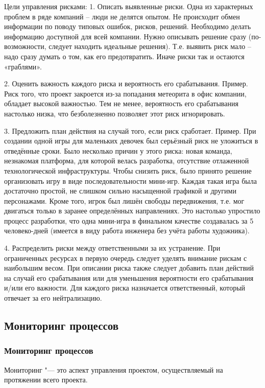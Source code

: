 \documentclass{../industrial-development}
\begin{document}
Цели управления рисками:
1. Описать выявленные риски.
Одна из характерных проблем в ряде компаний – люди не делятся опытом. Не происходит обмен информации по поводу типовых ошибок, рисков, решений. Необходимо делать информацию доступной для всей компании.
Нужно описывать решение сразу (по-возможности, следует находить идеальные решения). Т.е. выявить риск мало – надо сразу думать о том, как его предотвратить. Иначе риски так и остаются «граблями».

2. Оценить важность каждого риска и вероятность его срабатывания.
Пример. Риск того, что проект закроется из-за попадания метеорита в офис компании, обладает высокой важностью. Тем не менее, вероятность его срабатывания настолько низка, что безболезненно позволяет этот риск игнорировать.

3. Предложить план действия на случай того, если риск сработает.
Пример. При создании одной игры для маленьких девочек был серьёзный риск не уложиться в отведённые сроки. Было несколько причин у этого риска: новая команда, незнакомая платформа, для которой велась разработка, отсутствие отлаженной технологической инфраструктуры. Чтобы снизить риск, было принято решение организовать игру в виде последовательности мини-игр. Каждая такая игра была достаточно простой, не слишком сильно насыщенной графикой и другими персонажами. Кроме того, игрок был лишён свободы передвижения, т.е. мог двигаться только в заранее определённых направлениях. Это настолько упростило процесс разработки, что одна мини-игра в финальном качестве создавалась за 5 человеко-дней (имеется в виду работа инженера без учёта работы художника).

4. Распределить риски между ответственными за их устранение.
При ограниченных ресурсах в первую очередь следует уделять внимание рискам с наибольшим весом.
При описании риска также следует добавить план действий на случай его срабатывания или для уменьшения вероятности его срабатывания и/или его важности. Для каждого риска назначается ответственный, который отвечает за его нейтрализацию.

    \subsection{Мониторинг процессов}

\begin{frame} \frametitle{Мониторинг процессов}
	\begin{definition}
		Мониторинг "--- это аспект управления проектом, осуществляемый на протяжении всего проекта.
	\end{definition}
\end{frame}
\lecturenotes
\end{document}
